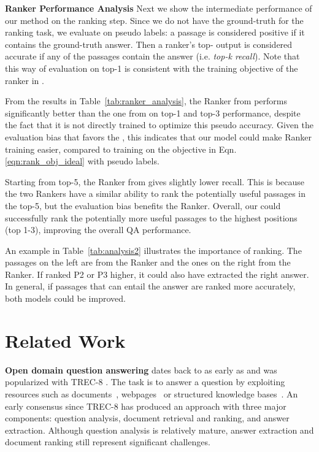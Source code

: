 \documentclass[letterpaper]{article} \usepackage{aaai18}  \usepackage{times}  \usepackage{helvet}  \usepackage{courier}  \usepackage{url}  \usepackage{graphicx}  \usepackage{comment}
\begin{document}
\noindent\textbf{Ranker Performance Analysis}\quad
Next we show the intermediate performance of our method on the ranking step.
Since we do not have the ground-truth for the ranking task, we evaluate on pseudo labels: a passage is considered  positive if it contains the ground-truth answer. Then a ranker's top- output is considered accurate if any of the  passages contain the answer (i.e. \emph{top-k recall}). 
Note that this way of evaluation on top-1 is consistent with the training objective of the ranker in .

From the results in Table~\ref{tab:ranker_analysis}, the Ranker from  performs significantly better than the one from  on top-1 and top-3 performance, despite the fact that it is not directly trained to optimize this pseudo accuracy. Given the evaluation bias that favors the , this indicates that our  model could make Ranker training easier, compared to training on the objective in Eqn.\ref{eqn:rank_obj_ideal} with pseudo labels.

{Starting from top-5, the Ranker from  gives slightly lower recall. This is because the two Rankers have a similar ability to rank the potentially useful passages in the top-5, but the evaluation bias benefits the  Ranker. 
Overall, our  could successfully rank the potentially more useful passages to the highest positions (top 1-3), improving the overall QA performance.}

An example in Table~\ref{tab:analysis2} illustrates the importance of ranking.  The passages on the left are from the  Ranker and the ones on the right from the  Ranker. If  ranked P2 or P3 higher, it could also have extracted the right answer. In general, if passages that can entail the answer are ranked more accurately, both models could be improved. 


\section{Related Work}

\textbf{Open domain question answering} dates back to as early as \cite{green1961baseball} and was popularized with TREC-8 \cite{voorhees1999trec}. The task is to answer a question by exploiting resources such as
documents~\cite{voorhees1999trec}, webpages~\cite{kwok2001scaling,chen2017discriminative} 
or structured knowledge bases~\cite{berant2013semantic,bordes2015large,yu2017improved}.
An early consensus since TREC-8 has produced an approach with three major components: question analysis, document retrieval and ranking, and answer extraction. Although question analysis is relatively mature, answer extraction and document ranking still represent significant challenges.
\end{document}

